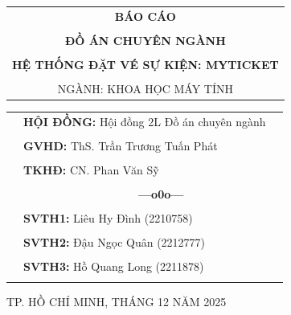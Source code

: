 \documentclass[a4paper]{article}
\theoremstyle{definition}
\begin{document}
\begin{titlepage}
\begin{center}
\begin{tabular}{c}
\multicolumn{1}{c}{\textbf{{\LARGE BÁO CÁO}}}\\
\\{\textbf{{\LARGE ĐỒ ÁN CHUYÊN NGÀNH}}}
\\
\\
\textbf{\LARGE HỆ THỐNG ĐẶT VÉ SỰ KIỆN: MYTICKET}
\\
\\ \vspace{0.5cm} {\Large NGÀNH: KHOA HỌC MÁY TÍNH}
\end{tabular}
\end{center}
\vspace{0.5cm}
\begin{center}
\begin{table}[h]
\begin{tabular}{rll}
\hspace{6 cm} &  \textbf{\Large HỘI ĐỒNG:} {\Large Hội đồng 2L Đồ án chuyên ngành}
\\
\\
\hspace{6 cm} &   \textbf{\Large GVHD:} {\Large ThS. Trần Trương Tuấn Phát}
\\
\\
\hspace{6 cm}  &   \textbf{\Large TKHĐ:} {\Large CN. Phan Văn Sỹ}
\\
\\
\hspace{6 cm} &     \textbf{$\;$ $\;$$\;$$\;$$\;$$\;$$\;$$\;$$\;$$\;$$\;$$\;$$\;$$\;$$\;$$\;$$\;$$\;$$\;$$\;$$\;$$\;$$\;$$\;$$\;$$\;$$\;$$\;$$\;$$\;$$\;$$\;$$\;$$\;$ \Large ---o0o---} 
\\
\\
\hspace{6 cm} &   \textbf{\Large SVTH1:} {\Large Liêu Hy Đình (2210758)}
\\
\\
\hspace{6 cm}&   \textbf{\Large SVTH2:}  {\Large Đậu Ngọc Quân (2212777)}
\\
\\
\hspace{6 cm} &   \textbf{\Large SVTH3:}  {\Large Hồ Quang Long (2211878)}
\\
\\
\end{tabular}
\end{table}
\end{center}
\vspace{0.5cm}
\begin{center}
{\Large TP. HỒ CHÍ MINH, THÁNG 12 NĂM 2025}
\end{center}
\end{titlepage}
\newpage
\pagestyle{empty}



\newpage
\tableofcontents
\newpage
\listoffigures
\newpage
\listoftables
\newpage
\pagestyle{fancy}
\setcounter{page}{1}
\end{document}
